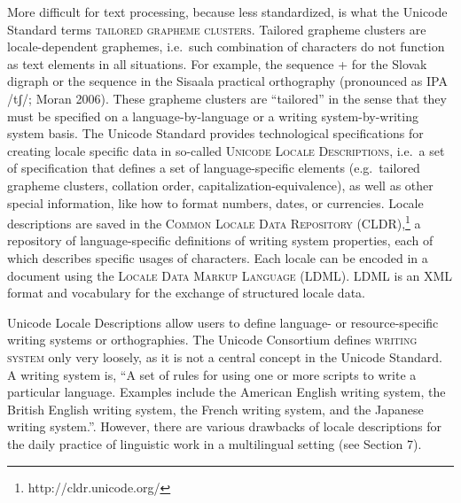 More difficult for text processing, because less standardized, is what the Unicode Standard terms \textsc{tailored grapheme clusters}. Tailored grapheme clusters are locale-dependent graphemes, i.e.~such combination of characters do not function as text elements in all situations. For example, the sequence + for the Slovak digraph or the sequence in the Sisaala practical orthography (pronounced as IPA /tʃ/; Moran 2006). These grapheme clusters are ``tailored'' in the sense that they must be specified on a language-by-language or a writing system-by-writing system basis. The Unicode Standard provides technological specifications for creating locale specific data in so-called \textsc{Unicode Locale Descriptions}, i.e.~a set of specification that defines a set of language-specific elements (e.g.~tailored grapheme clusters, collation order, capitalization-equivalence), as well as other special information, like how to format numbers, dates, or currencies. Locale descriptions are saved in the \textsc{Common Locale Data Repository (CLDR)},\footnote{http://cldr.unicode.org/} a repository of language-specific definitions of writing system properties, each of which describes specific usages of characters. Each locale can be encoded in a document using the \textsc{Locale Data Markup Language (LDML)}. LDML is an XML format and vocabulary for the exchange of structured locale data.

Unicode Locale Descriptions allow users to define language- or resource-specific writing systems or orthographies. The Unicode Consortium defines \textsc{writing system} only very loosely, as it is not a central concept in the Unicode Standard. A writing system is, ``A set of rules for using one or more scripts to write a particular language. Examples include the American English writing system, the British English writing system, the French writing system, and the Japanese writing system.''. However, there are various drawbacks of locale descriptions for the daily practice of linguistic work in a multilingual setting (see Section 7).